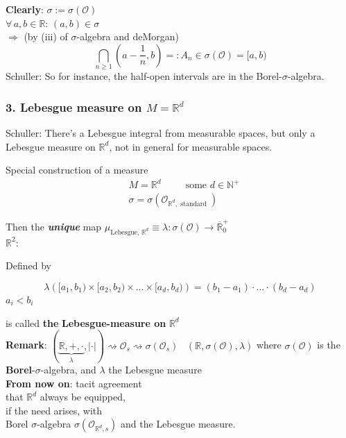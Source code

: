 \textbf{Clearly}: $\sigma := \sigma(\mathcal{O})$ \\

$\forall \, a, b \in \mathbb{R}$: $(a,b) \in \sigma$ \\

$\Longrightarrow$ (by (iii) of $\sigma$-algebra and deMorgan) 
\[
\bigcap_{n \geq 1} \left( a - \frac{1}{n}, b \right) =: A_n \in \sigma(\mathcal{O}) = [a, b)
 \]
Schuller: So for instance, the half-open intervals are in the Borel-$\sigma$-algebra.

\subsubsection{3. Lebesgue measure on $M = \mathbb{R}^d$}

Schuller: There's a Lebesgue integral from measurable spaces, but only a Lebesgue measure on $\mathbb{R}^d$, not in general for measurable spaces.

Special construction of a measure 
\[
\begin{aligned}
	& M = \mathbb{R}^d \quad \quad \, \text{ some } d \in \mathbb{N}^+ \\
	& \sigma = \sigma \left( \mathcal{O}_{\mathbb{R}^d, \text{ standard } } \right)
\end{aligned}
\]

Then the \emph{\textbf{unique}} map $\mu_{\text{Lebesgue, $\mathbb{R}^d$} } \equiv \lambda : \sigma(\mathcal{O}) \to \overline{ \mathbb{R}}^+_0$ \\

$\mathbb{R}^2$:

Defined by

\[
\lambda \left( [a_1, b_1) \times [a_2, b_2) \times \dots \times [a_d, b_d) \right) = (b_1 - a_1) \cdot \dots \cdot (b_d - a_d) 
\]
$a_i < b_i$

is called \textbf{the} \textbf{Lebesgue-measure on} $\mathbb{R}^d$ \\

\textbf{Remark}: $(\underbrace{ \mathbb{R}, +, \cdot}_{\lambda}, |\cdot |) \rightsquigarrow \mathcal{O}_s \rightsquigarrow \sigma(\mathcal{O}_s)$ \quad \quad \, $(\mathbb{R}, \sigma(\mathcal{O}), \lambda)$ where $\sigma(\mathcal{O})$ is the \textbf{Borel}-$\sigma$-algebra, and $\lambda$ the Lebesgue measure \\

\textbf{From now on}: tacit agreement \\
\phantom{From now on} that $\mathbb{R}^d$ always be equipped, \\
\phantom{From now on} if the need arises, with \\
\phantom{From now on} Borel $\sigma$-algebra $\sigma(\mathcal{O}_{\mathbb{R}^d, s})$ and the Lebesgue measure. \\

